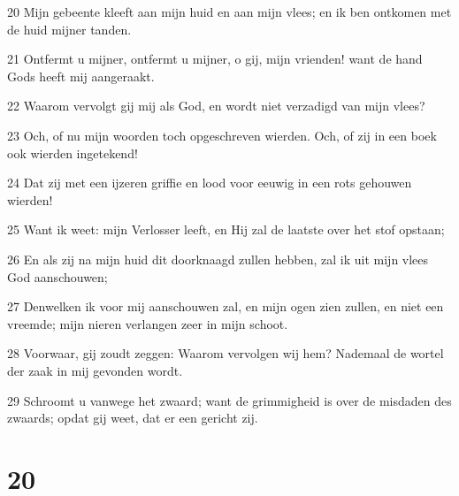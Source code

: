 \par 20 Mijn gebeente kleeft aan mijn huid en aan mijn vlees; en ik ben ontkomen met de huid mijner tanden.
\par 21 Ontfermt u mijner, ontfermt u mijner, o gij, mijn vrienden! want de hand Gods heeft mij aangeraakt.
\par 22 Waarom vervolgt gij mij als God, en wordt niet verzadigd van mijn vlees?
\par 23 Och, of nu mijn woorden toch opgeschreven wierden. Och, of zij in een boek ook wierden ingetekend!
\par 24 Dat zij met een ijzeren griffie en lood voor eeuwig in een rots gehouwen wierden!
\par 25 Want ik weet: mijn Verlosser leeft, en Hij zal de laatste over het stof opstaan;
\par 26 En als zij na mijn huid dit doorknaagd zullen hebben, zal ik uit mijn vlees God aanschouwen;
\par 27 Denwelken ik voor mij aanschouwen zal, en mijn ogen zien zullen, en niet een vreemde; mijn nieren verlangen zeer in mijn schoot.
\par 28 Voorwaar, gij zoudt zeggen: Waarom vervolgen wij hem? Nademaal de wortel der zaak in mij gevonden wordt.
\par 29 Schroomt u vanwege het zwaard; want de grimmigheid is over de misdaden des zwaards; opdat gij weet, dat er een gericht zij.

\chapter{20}

